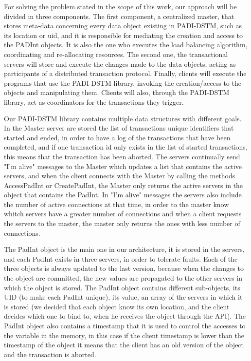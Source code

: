 \documentclass[times, 10pt,twocolumn]{article}
\begin{document}



For solving the problem stated in the scope of this work, our approach will be divided in three components.
The first component, a centralized master, that stores meta-data concerning every data object existing in PADI-DSTM, such as its location or uid, and it is responsible for mediating the creation and access to the PADInt objects. It is also the one who executes the load balancing algorithm, coordinating and re-allocating resources. The second one, the transactional servers will store and execute the changes made to the data objects, acting as participants of a distributed transaction protocol. Finally, clients will execute the programs that use the PADI-DSTM library, invoking the creation/access to the objects and manipulating them. Clients will also, through the PADI-DSTM library, act as coordinators for the transactions they trigger. 


Our PADI-DSTM library contains multiple data structures with different goals. In the Master server are stored the list of transactions unique identifiers that started and ended, in order to have a log of the transactions that have been completed, and if one transaction id only exists in the list of started transactions, this means that the transaction has been aborted. The servers continually send "I'm alive" messages to the Master which updates a list that contains the active servers, and when the client connects with the Master by calling the methods AccessPadInt or CreatePadInt, the Master only returns the active servers in the object that contains the PadInt. In "I'm alive" messages the servers also include the number of active connections at that time, in order to the master know whitch servers have a greater number of connections and when a client requests the servers to the master, the master only returns the ones with less number of connections.  

The PadInt object is the main one in our architecture, it is stored in the servers, and each PadInt exists in three servers, in order to tolerate faults. Each of the three objects is always updated to the last version, because when the changes to the object are committed, the new values are propagated to the other servers in which the object is stored. The PadInt object contains different sub-objects, its UID (to make each PadInt unique), its value, an array of the servers in which it is stored (we decided that each object know its own location, and the client decides which one to bind to, when he receives the object through the API). The PadInt object also contains a timestamp that it is used to control the accesses to the variable in the memory, in this case if the client timestamp is lower than the timestamp of the object it means that the client has an old version of the object and the transaction is aborted.
\end{document}
